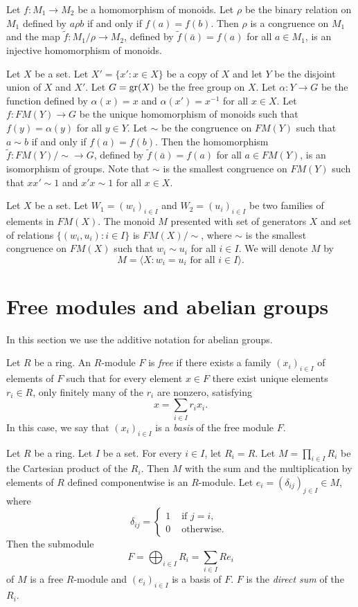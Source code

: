 \begin{example}
Let $f\colon M_1\rightarrow M_2$ be a homomorphism of monoids. Let $\rho$ be the binary relation on $M_1$ defined by
$a\rho b$ if and only if $f(a)=f(b)$. Then $\rho$ is a congruence on $M_1$ and the map $\tilde f\colon M_1/\rho\rightarrow M_2$, defined by $\tilde f(\bar a)=f(a)$ for all $a\in M_1$, is an injective homomorphism of monoids.
\end{example}

\begin{example}
Let $X$ be a set. Let $X'=\{ x' : x\in X\}$ be a copy of $X$ and let $Y$ be the disjoint union of $X$ and $X'$. Let $G=\operatorname{gr}(X)$ be the free group on $X$. Let $\alpha\colon Y\rightarrow G$ be the function defined by $\alpha(x)=x$ and $\alpha(x')=x^{-1}$ for all $x\in X$. Let $f\colon FM(Y)\rightarrow G$ be the unique homomorphism of monoids such that $f(y)=\alpha(y)$ for all $y\in Y$. Let $\sim$ be the congruence on $FM(Y)$ such that $a\sim b$ if and only if $f(a)=f(b)$. Then the homomorphism $\tilde f\colon FM(Y)/\sim\rightarrow G$, defined by $\tilde f(\bar a)=f(a)$ for all $a\in FM(Y)$, is an isomorphism of groups. Note that $\sim$ is the smallest congruence on $FM(Y)$ such that $xx'\sim 1$ and $x'x\sim 1$ for all $x\in X$. 
\end{example}

Let $X$ be a set. Let $W_1=(w_i)_{i\in I}$ and $W_2=(u_i)_{i\in I}$ be two families of elements in $FM(X)$. The monoid $M$ presented with set of generators $X$ and set of relations $\{(w_i,u_i) : i\in I\}$ is $FM(X)/\sim$, where $\sim$ is the smallest congruence on $FM(X)$ such that $w_i\sim u_i$ for all $i\in I$. We will denote $M$ by
\[ M=\langle X : w_i=u_i\text{ for all }i\in I\rangle.\]

\section{Free modules and abelian groups}
In this section we use the additive notation for abelian groups.

Let $R$ be a ring. An $R$-module $F$ is {\em free} if there exists a family $(x_i)_{i\in I}$ of elements of $F$ such that for every element $x\in F$ there exist unique elements $r_i\in R$, only finitely many of the $r_i$ are nonzero, satisfying 
\[x=\sum_{i\in I}r_ix_i.\]
In this case, we say that $(x_i)_{i\in I}$ is a {\em basis} of the free module $F$.

\begin{example}
Let $R$ be a ring. Let $I$ be a set. For every $i\in I$, let $R_i=R$.
Let $M=\prod_{i\in I}R_i$ be the Cartesian product of the $R_i$. Then $M$ with the sum and the multiplication by elements of $R$ defined componentwise is an $R$-module. Let $e_i=(\delta_{ij})_{j\in I}\in M$, where 
\[\delta_{ij}=\left\{\begin{array}{cl}
1&\text{ if }j=i,\\
0&\text{ otherwise. }
\end{array}\right. \]
Then the submodule
\[ F=\bigoplus_{i\in I}R_i=\sum_{i\in I}Re_i\]
of $M$ is a free $R$-module and $(e_{i})_{i\in I}$ is a basis of $F$. $F$ is the {\em direct sum} of the $R_i$.
\end{example}

